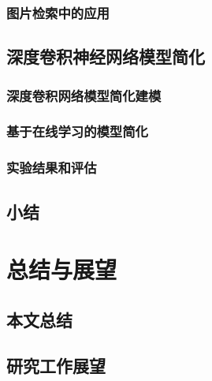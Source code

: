 \documentclass[doctor]{ustcthesis}
\begin{document}
\subsection{图片检索中的应用}
\section{深度卷积神经网络模型简化}
\subsection{深度卷积网络模型简化建模}
\subsection{基于在线学习的模型简化}
\subsection{实验结果和评估}
\section{小结}




\chapter{总结与展望}
\section{本文总结}
\section{研究工作展望}



\nocite{*} %



\appendix

\backmatter

\end{document}
